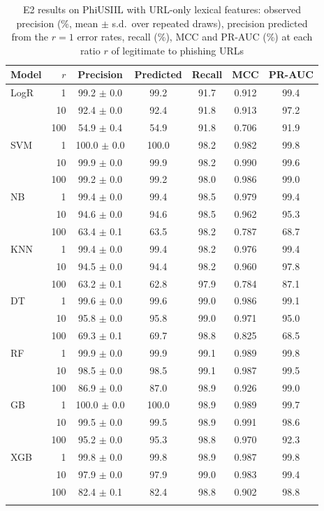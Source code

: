 \begin{table}[htbp]
\caption{E2 results on PhiUSIIL with URL-only lexical features: observed precision (\%, mean $\pm$ s.d.\ over repeated draws), precision predicted from the $r=1$ error rates, recall (\%), MCC and PR-AUC (\%) at each ratio $r$ of legitimate to phishing URLs}\label{tab:e2-lexical}%
\begin{tabular}{@{}lrccccc@{}}
\toprule
Model & $r$ & Precision & Predicted & Recall & MCC & PR-AUC \\
\midrule
LogR & 1 & 99.2 $\pm$ 0.0 & 99.2 & 91.7 & 0.912 & 99.4 \\
 & 10 & 92.4 $\pm$ 0.0 & 92.4 & 91.8 & 0.913 & 97.2 \\
 & 100 & 54.9 $\pm$ 0.4 & 54.9 & 91.8 & 0.706 & 91.9 \\
SVM & 1 & 100.0 $\pm$ 0.0 & 100.0 & 98.2 & 0.982 & 99.8 \\
 & 10 & 99.9 $\pm$ 0.0 & 99.9 & 98.2 & 0.990 & 99.6 \\
 & 100 & 99.2 $\pm$ 0.0 & 99.2 & 98.0 & 0.986 & 99.0 \\
NB & 1 & 99.4 $\pm$ 0.0 & 99.4 & 98.5 & 0.979 & 99.4 \\
 & 10 & 94.6 $\pm$ 0.0 & 94.6 & 98.5 & 0.962 & 95.3 \\
 & 100 & 63.4 $\pm$ 0.1 & 63.5 & 98.2 & 0.787 & 68.7 \\
KNN & 1 & 99.4 $\pm$ 0.0 & 99.4 & 98.2 & 0.976 & 99.4 \\
 & 10 & 94.5 $\pm$ 0.0 & 94.4 & 98.2 & 0.960 & 97.8 \\
 & 100 & 63.2 $\pm$ 0.1 & 62.8 & 97.9 & 0.784 & 87.1 \\
DT & 1 & 99.6 $\pm$ 0.0 & 99.6 & 99.0 & 0.986 & 99.1 \\
 & 10 & 95.8 $\pm$ 0.0 & 95.8 & 99.0 & 0.971 & 95.0 \\
 & 100 & 69.3 $\pm$ 0.1 & 69.7 & 98.8 & 0.825 & 68.5 \\
RF & 1 & 99.9 $\pm$ 0.0 & 99.9 & 99.1 & 0.989 & 99.8 \\
 & 10 & 98.5 $\pm$ 0.0 & 98.5 & 99.1 & 0.987 & 99.5 \\
 & 100 & 86.9 $\pm$ 0.0 & 87.0 & 98.9 & 0.926 & 99.0 \\
GB & 1 & 100.0 $\pm$ 0.0 & 100.0 & 98.9 & 0.989 & 99.7 \\
 & 10 & 99.5 $\pm$ 0.0 & 99.5 & 98.9 & 0.991 & 98.6 \\
 & 100 & 95.2 $\pm$ 0.0 & 95.3 & 98.8 & 0.970 & 92.3 \\
XGB & 1 & 99.8 $\pm$ 0.0 & 99.8 & 98.9 & 0.987 & 99.8 \\
 & 10 & 97.9 $\pm$ 0.0 & 97.9 & 99.0 & 0.983 & 99.4 \\
 & 100 & 82.4 $\pm$ 0.1 & 82.4 & 98.8 & 0.902 & 98.8 \\
\botrule
\end{tabular}
\end{table}
